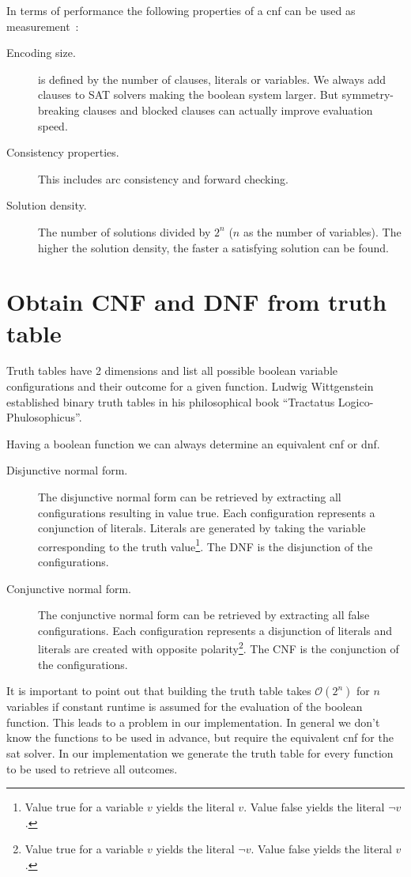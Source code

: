 In terms of performance the following properties of a \gls{cnf} can be used as measurement~\cite{Sat20}:
\begin{description}
  \item[Encoding size.]
    is defined by the number of clauses, literals or variables.
    We always add clauses to SAT solvers making the boolean system larger. But symmetry-breaking clauses and blocked clauses can actually improve evaluation speed.
  \item[Consistency properties.]
    This includes arc consistency and forward checking.
  \item[Solution density.]
    The number of solutions divided by $2^n$ ($n$ as the number of variables). The higher the solution density, the faster a satisfying solution can be found.
\end{description}

\section{Obtain CNF and DNF from truth table}
\label{sec:cnf-dnf}
%
Truth tables have 2 dimensions and list all possible boolean variable configurations and their outcome for a given function. Ludwig Wittgenstein established binary truth tables in his philosophical book ``Tractatus Logico-Phulosophicus''.

Having a boolean function we can always determine an equivalent \gls{cnf} or \gls{dnf}.

\begin{description}
  \item[Disjunctive normal form.]
    The disjunctive normal form can be retrieved by extracting all configurations resulting in value true. Each configuration represents a conjunction of literals. Literals are generated by taking the variable corresponding to the truth value\footnote{Value true for a variable $v$ yields the literal $v$. Value false yields the literal $\neg v$.}. The DNF is the disjunction of the configurations.
  \item[Conjunctive normal form.]
    The conjunctive normal form can be retrieved by extracting all false configurations. Each configuration represents a disjunction of literals and literals are created with opposite polarity\footnote{Value true for a variable $v$ yields the literal $\neg v$. Value false yields the literal $v$.}. The CNF is the conjunction of the configurations.
\end{description}

It is important to point out that building the truth table takes $\mathcal{O}(2^n)$ for $n$ variables if constant runtime is assumed for the evaluation of the boolean function. This leads to a problem in our implementation. In general we don't know the functions to be used in advance, but require the equivalent \gls{cnf} for the \gls{sat} solver. In our implementation we generate the truth table for every function to be used to retrieve all outcomes.

